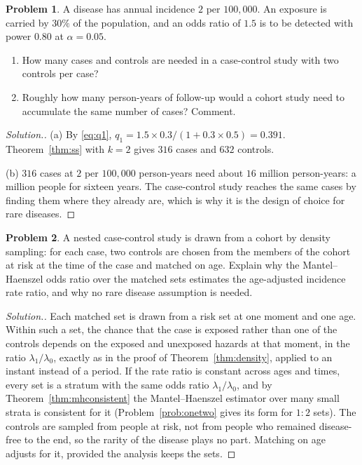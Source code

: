 \documentclass[11pt,a4paper]{article}
\numberwithin{equation}{section}
\theoremstyle{definition}
\newtheorem{problemx}{Problem}[subsection]
\newenvironment{problem}{\begin{problemx}}{\end{problemx}}
\newenvironment{solution}
  {\renewcommand{\qedsymbol}{}\begin{proof}[\textit{Solution}.]}
  {\end{proof}}
\begin{document}
\begin{problem}
A disease has annual incidence $2$ per $100{,}000$. An exposure is carried by $30\%$ of the population, and an odds ratio of $1.5$ is to be detected with
power $0.80$ at $\alpha = 0.05$.
\begin{enumerate}[label=(\alph*)]
\item How many cases and controls are needed in a case-control study with two controls per case?
\item Roughly how many person-years of follow-up would a cohort study need to accumulate the same number of cases? Comment.
\end{enumerate}
\end{problem}

\begin{solution}
(a) By \eqref{eq:q1}, $q_1 = 1.5 \times 0.3/(1 + 0.3 \times 0.5) = 0.391$. Theorem~\ref{thm:ss} with $k = 2$ gives $316$ cases and $632$ controls.

(b) $316$ cases at $2$ per $100{,}000$ person-years need about $16$ million person-years: a million people for sixteen years. The case-control study
reaches the same cases by finding them where they already are, which is why it is the design of choice for rare diseases.
\end{solution}

\begin{problem}
A nested case-control study is drawn from a cohort by density sampling: for each case, two controls are chosen from the members of the
cohort at risk at the time of the case and matched on age. Explain why the Mantel--Haenszel odds ratio over the matched sets estimates
the age-adjusted incidence rate ratio, and why no rare disease assumption is needed.
\end{problem}

\begin{solution}
Each matched set is drawn from a risk set at one moment and one age. Within such a set, the chance that the case is exposed rather than one
of the controls depends on the exposed and unexposed hazards at that moment, in the ratio $\lambda_1/\lambda_0$, exactly as in the proof of
Theorem~\ref{thm:density}, applied to an instant instead of a period. If the rate ratio is constant across ages and times, every set is a
stratum with the same odds ratio $\lambda_1/\lambda_0$, and by Theorem~\ref{thm:mhconsistent} the Mantel--Haenszel estimator over many small strata is
consistent for it (Problem~\ref{prob:onetwo} gives its form for $1{:}2$ sets). The controls are sampled from people at risk, not from people who
remained disease-free to the end, so the rarity of the disease plays no part. Matching on age adjusts for it, provided the analysis keeps the
sets.
\end{solution}
\end{document}
